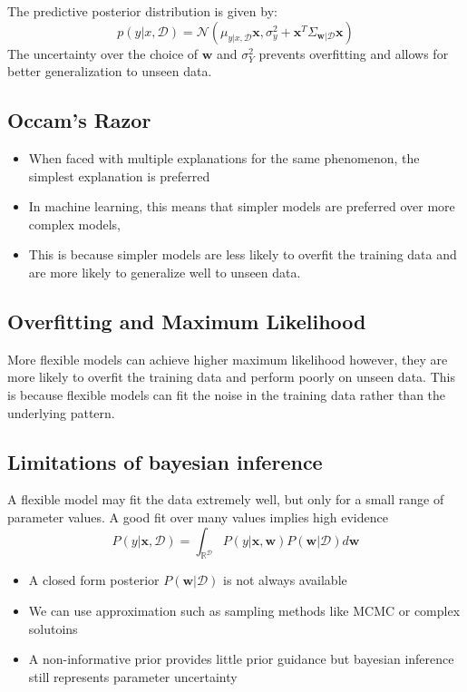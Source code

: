 \documentclass[12pt,a4paper]{article}
\begin{document}
The predictive posterior distribution is given by:
\[
p(y|x, \mathcal{D}) = \mathcal{N}(\mu_{y|x, \mathcal{D}}\mathbf{x}, \sigma^2_{y} + \mathbf{x}^T \Sigma_{\mathbf{w}|\mathcal{D}} \mathbf{x})
\]
The uncertainty over the choice of $\mathbf{w}$ and $\sigma_Y^2$ prevents overfitting and allows for better generalization to unseen data.

\subsection{Occam's Razor}
\begin{itemize}
    \item When faced with multiple explanations for the same phenomenon, the simplest explanation is preferred
    \item In machine learning, this means that simpler models are preferred over more complex models,
    \item This is because simpler models are less likely to overfit the training data and are more likely to generalize well to unseen data.
\end{itemize}

\subsection{Overfitting and Maximum Likelihood}
More flexible models can achieve higher maximum likelihood however, they are more likely to overfit the training data and perform poorly on unseen data. This is because flexible models can fit the noise in the training data rather than the underlying pattern.

\subsection{Limitations of bayesian inference}
A flexible model may fit the data extremely well, but only for a small range of parameter values. A good fit over many values implies high evidence
\[
P(y|\mathbf{x},\mathcal{D}) = \int_{\mathbb{R^\mathcal{D}}}^{} P(y|\mathbf{x},\mathbf{w})P(\mathbf{w}|\mathcal{D}) d\mathbf{w}
\]
\begin{itemize}
    \item A closed form posterior $P(\mathbf{w}|\mathcal{D})$ is not always available
    \item We can use approximation such as sampling methods like MCMC or complex solutoins
    \item A non-informative prior provides little prior guidance but bayesian inference still represents parameter uncertainty
\end{itemize}
\end{document}
